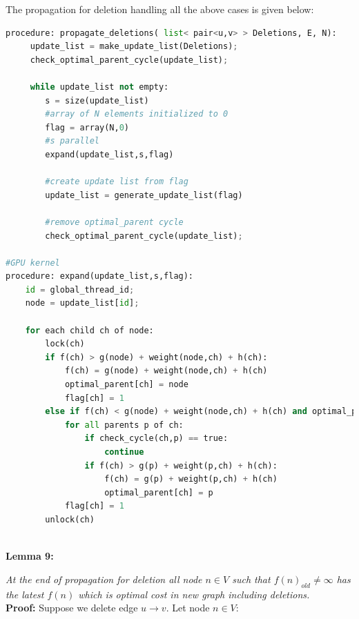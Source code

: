 \documentclass[a4paper]{article}
\begin{document}

The propagation for deletion handling all the above cases is given below:
\begin{lstlisting}[language=python, caption=Propagation of Deletions]
procedure: propagate_deletions( list< pair<u,v> > Deletions, E, N):
     update_list = make_update_list(Deletions);
     check_optimal_parent_cycle(update_list);
     
     while update_list not empty:
        s = size(update_list)
        #array of N elements initialized to 0
        flag = array(N,0)
        #s parallel
        expand(update_list,s,flag)
        
        #create update list from flag
        update_list = generate_update_list(flag)
        
        #remove optimal_parent cycle 
        check_optimal_parent_cycle(update_list);

#GPU kernel
procedure: expand(update_list,s,flag):
    id = global_thread_id;
    node = update_list[id];
    
    for each child ch of node:
        lock(ch)
        if f(ch) > g(node) + weight(node,ch) + h(ch):
            f(ch) = g(node) + weight(node,ch) + h(ch)  
            optimal_parent[ch] = node
            flag[ch] = 1
        else if f(ch) < g(node) + weight(node,ch) + h(ch) and optimal_parent[ch] == node:
            for all parents p of ch:
                if check_cycle(ch,p) == true:
                    continue
                if f(ch) > g(p) + weight(p,ch) + h(ch):
                    f(ch) = g(p) + weight(p,ch) + h(ch)
                    optimal_parent[ch] = p
            flag[ch] = 1
        unlock(ch)
        
\end{lstlisting}
\hypertarget{Lemma 9}{\textbf{Lemma 9:}} \textit{At the end of propagation for deletion all node  $ n \in V$  such that $f(n)_{old} \neq \infty $ has the latest $f(n)$ which is optimal cost in new graph including deletions. }\\
\textbf{Proof:} Suppose we delete edge $u \rightarrow v$. Let node $n \in V$:\\
\end{document}
